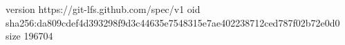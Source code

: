 version https://git-lfs.github.com/spec/v1
oid sha256:da809cdef4d393298f9d3c44635e7548315e7ae402238712ced787f02b72e0d0
size 196704
